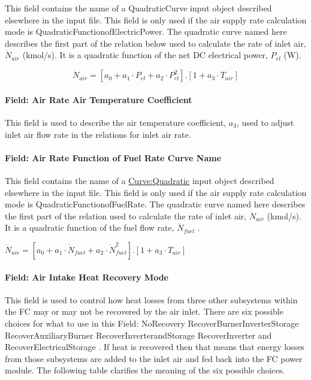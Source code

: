 This field contains the name of a QuadraticCurve input object described elsewhere in the input file. This field is only used if the air supply rate calculation mode is QuadraticFunctionofElectricPower. The quadratic curve named here describes the first part of the relation below used to calculate the rate of inlet air, \({\dot N_{air}}\) (kmol/s). It is a quadratic function of the net DC electrical power, \({P_{el}}\) (W).

\begin{equation}
{\dot N_{air}} = \left[ {{a_0} + {a_1} \cdot {P_{el}} + {a_2} \cdot P_{el}^2} \right].\left[ {1 + {a_3} \cdot {T_{air}}} \right]
\end{equation}

\paragraph{Field: Air Rate Air Temperature Coefficient}\label{field-air-rate-air-temperature-coefficient}

This field is used to describe the air temperature coefficient, \({a_3}\), used to adjust inlet air flow rate in the relations for inlet air rate.

\paragraph{Field: Air Rate Function of Fuel Rate Curve Name}\label{field-air-rate-function-of-fuel-rate-curve-name}

This field contains the name of a \hyperref[curvequadratic]{Curve:Quadratic} input object described elsewhere in the input file. This field is only used if the air supply rate calculation mode is QuadraticFunctionofFuelRate. The quadratic curve named here describes the first part of the relation used to calculate the rate of inlet air, \({\dot N_{air}}\) (kmol/s). It is a quadratic function of the fuel flow rate, \({\dot N_{fuel}}\) .

 \({\dot N_{air}} = \left[ {{a_0} + {a_1} \cdot {{\dot N}_{fuel}} + {a_2} \cdot \dot N_{fuel}^2} \right].\left[ {1 + {a_3} \cdot {T_{air}}} \right]\)

\paragraph{Field: Air Intake Heat Recovery Mode}\label{field-air-intake-heat-recovery-mode}

This field is used to control how heat losses from three other subsystems within the FC may or may not be recovered by the air inlet. There are six possible choices for what to use in this Field: NoRecovery RecoverBurnerInverterStorage RecoverAuxiliaryBurner RecoverInverterandStorage RecoverInverter and RecoverElectricalStorage . If heat is recovered then that means that energy losses from those subsystems are added to the inlet air and fed back into the FC power module. The following table clarifies the meaning of the six possible choices.

